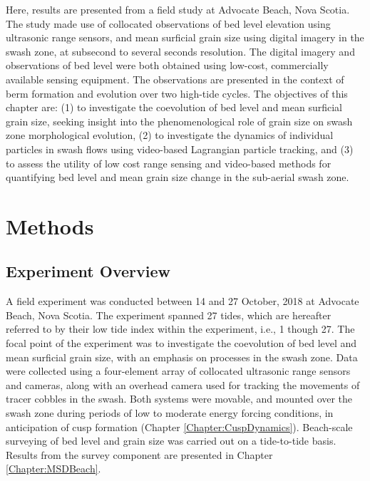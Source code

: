 Here, results are presented from a field study at Advocate Beach, Nova Scotia. The study made use of collocated observations of bed level elevation using ultrasonic range sensors, and mean surficial grain size using digital imagery in the swash zone, at subsecond to several seconds resolution. The digital imagery and observations of bed level were both obtained using low-cost, commercially available sensing equipment. The observations are presented in the context of berm formation and evolution over two high-tide cycles. The objectives of this chapter are: (1) to investigate the coevolution of bed level and mean surficial grain size, seeking insight into the phenomenological role of grain size on swash zone morphological evolution, (2) to investigate the dynamics of individual particles in swash flows using video-based Lagrangian particle tracking, and (3) to assess the utility of low cost range sensing and video-based methods for quantifying bed level and mean grain size change in the sub-aerial swash zone. %



\section{Methods}\label{Adv2018_methods}

\subsection{Experiment Overview}\label{subsec:Experiment}


A field experiment was conducted between 14 and 27 October, 2018 at Advocate Beach, Nova Scotia. The experiment spanned 27 tides, which are hereafter referred to by their low tide index within the experiment, i.e., 1 though 27. The focal point of the experiment was to investigate the coevolution of bed level and mean surficial grain size, with an emphasis on processes in the swash zone. Data were collected using a four-element array of collocated ultrasonic range sensors and cameras, along with an overhead camera used for tracking the movements of tracer cobbles in the swash. Both systems were movable, and mounted over the swash zone during periods of low to moderate energy forcing conditions, in anticipation of cusp formation (Chapter \ref{Chapter:CuspDynamics}). Beach-scale surveying of bed level and grain size was carried out on a tide-to-tide basis. Results from the survey component are presented in Chapter \ref{Chapter:MSDBeach}.


